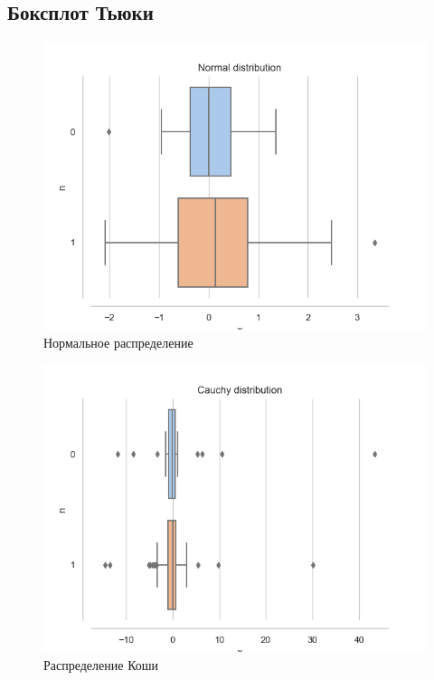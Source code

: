 \documentclass[a4paper,14pt]{article}
\begin{document}
	\subsection{Боксплот Тьюки}
	\begin{figure}[H]
		\centering
		\includegraphics[scale=0.6]{../image/lab3/lab3_norm.png}
		\caption{Нормальное распределение}
		\label{fig:normal}
	\end{figure}
	
	\begin{figure}[H]
		\centering
		\includegraphics[scale=0.6]{../image/lab3/lab3_cauchy.png}
		\caption{Распределение Коши}
		\label{fig:cauchy}
	\end{figure}
	
\end{document}
